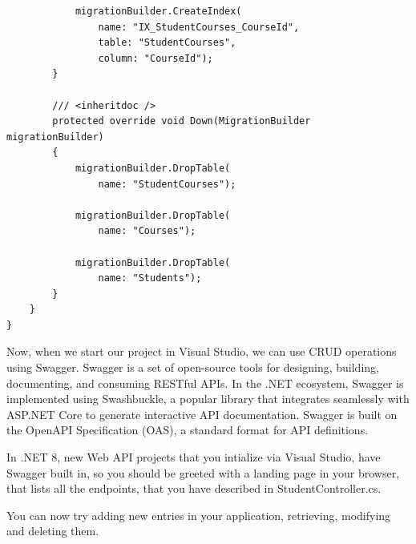\begin{lstlisting}
            migrationBuilder.CreateIndex(
                name: "IX_StudentCourses_CourseId",
                table: "StudentCourses",
                column: "CourseId");
        }

        /// <inheritdoc />
        protected override void Down(MigrationBuilder migrationBuilder)
        {
            migrationBuilder.DropTable(
                name: "StudentCourses");

            migrationBuilder.DropTable(
                name: "Courses");

            migrationBuilder.DropTable(
                name: "Students");
        }
    }
}
\end{lstlisting}

Now, when we start our project in Visual Studio, we can use CRUD operations using Swagger. Swagger is a set of open-source tools for
designing, building, documenting, and consuming RESTful APIs. In the .NET ecosystem, Swagger is implemented using Swashbuckle, a popular
library that integrates seamlessly with ASP.NET Core to generate interactive API documentation. Swagger is built on the OpenAPI Specification
(OAS), a standard format for API definitions.

In .NET 8, new Web API projects that you intialize via Visual Studio, have Swagger built in, so you should be greeted with a landing page in your browser, that lists all the endpoints, that you have described in StudentController.cs.

You can now try adding new entries in your application, retrieving, modifying and deleting them.


\medskip

